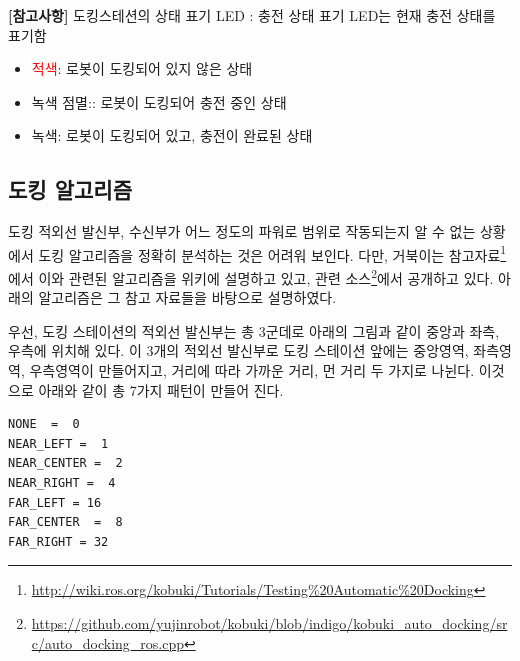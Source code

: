 \vspace{\baselineskip}
\textbf{[참고사항]} 도킹스테션의 상태 표기 LED : 충전 상태 표기 LED는 현재 충전 상태를 표기함
\begin{itemize}[leftmargin=*]
\item \textcolor{red}{적색}: 로봇이 도킹되어 있지 않은 상태
\item {\color{limegreen}녹색 점멸}:: 로봇이 도킹되어 충전 중인 상태
\item {\color{limegreen}녹색}: 로봇이 도킹되어 있고, 충전이 완료된 상태
\end{itemize}

\subsection{도킹 알고리즘}

도킹 적외선 발신부, 수신부가 어느 정도의 파워로 범위로 작동되는지 알 수 없는 상황에서 도킹 알고리즘을 정확히 분석하는 것은 어려워 보인다. 다만, 거북이는 참고자료\footnote{\url{http://wiki.ros.org/kobuki/Tutorials/Testing\%20Automatic\%20Docking}}에서 이와 관련된 알고리즘을 위키에 설명하고 있고, 관련 소스\footnote{\url{https://github.com/yujinrobot/kobuki/blob/indigo/kobuki_auto_docking/src/auto_docking_ros.cpp}}에서 공개하고 있다. 아래의 알고리즘은 그 참고 자료들을 바탕으로 설명하였다.

우선, 도킹 스테이션의 적외선 발신부는 총 3군데로 아래의 그림과 같이 중앙과 좌측, 우측에 위치해 있다. 이 3개의 적외선 발신부로 도킹 스테이션 앞에는 중앙영역, 좌측영역, 우측영역이 만들어지고, 거리에 따라 가까운 거리, 먼 거리 두 가지로 나뉜다. 이것으로 아래와 같이 총 7가지 패턴이 만들어 진다. 

\vspace{\baselineskip}
\begin{lstlisting}[language=ROS]
NONE  =  0
NEAR_LEFT =  1
NEAR_CENTER =  2
NEAR_RIGHT =  4
FAR_LEFT = 16
FAR_CENTER  =  8
FAR_RIGHT = 32
\end{lstlisting}

